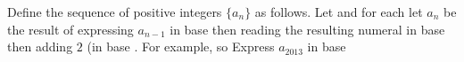 Define the sequence of positive integers $\{a_n\}$ as follows.  Let   and for each  let $a_n$ be the result of expressing $a_{n-1}$ in base  then reading the resulting numeral in base  then adding $2$ (in base .  For example,  so   Express $a_{2013}$ in base 